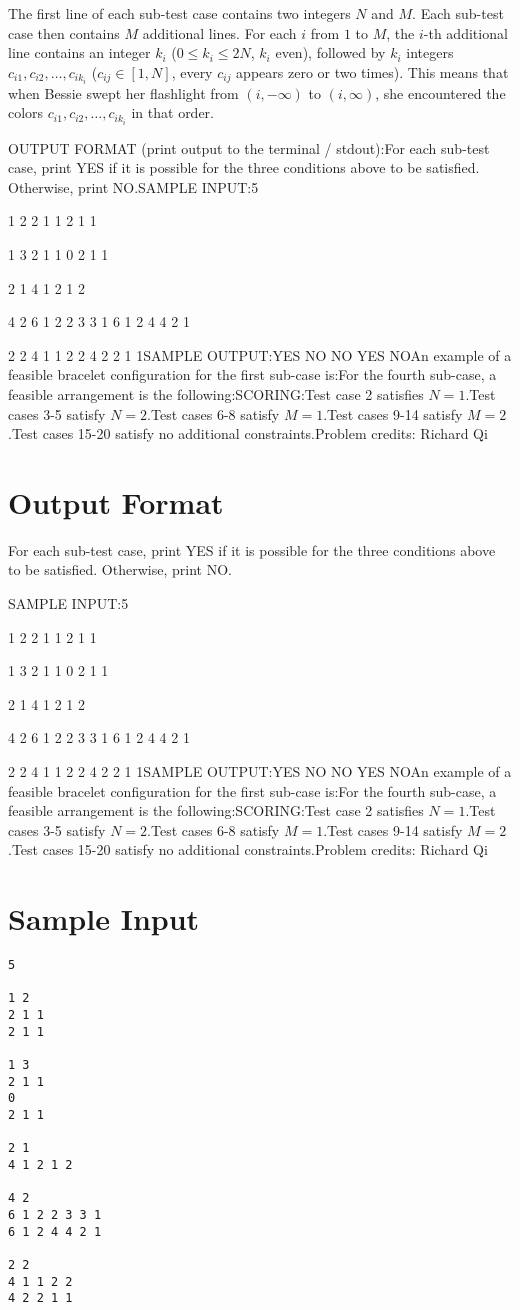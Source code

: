 \documentclass[12pt]{article}
\begin{document}
The first line of each sub-test case contains two integers $N$ and $M$. Each
sub-test case then contains $M$ additional lines. For each $i$ from $1$ to $M$,
the $i$-th additional line contains an integer $k_i$ ($0\le k_i\le 2N$, $k_i$
even), followed by $k_i$ integers $c_{i1}, c_{i2},\ldots, c_{ik_i}$
($c_{ij}\in [1,N]$, every $c_{ij}$ appears zero or two times). This means that
when Bessie swept her flashlight from $(i,-\infty)$ to $(i,\infty)$, she
encountered the colors $c_{i1}, c_{i2},\ldots, c_{ik_i}$ in that order.

OUTPUT FORMAT (print output to the terminal / stdout):For each sub-test case, print YES if it is possible for the three conditions
above to be satisfied. Otherwise, print NO.SAMPLE INPUT:5

1 2
2 1 1
2 1 1

1 3
2 1 1
0
2 1 1

2 1
4 1 2 1 2

4 2
6 1 2 2 3 3 1
6 1 2 4 4 2 1

2 2
4 1 1 2 2
4 2 2 1 1SAMPLE OUTPUT:YES
NO
NO
YES
NOAn example of a feasible bracelet configuration for the first sub-case is:For the fourth sub-case, a feasible arrangement is the following:SCORING:Test case 2 satisfies $N = 1$.Test cases 3-5 satisfy $N=2$.Test cases 6-8 satisfy $M=1$.Test cases 9-14 satisfy $M=2$.Test cases 15-20 satisfy no additional constraints.Problem credits: Richard Qi

\section*{Output Format}
For each sub-test case, print YES if it is possible for the three conditions
above to be satisfied. Otherwise, print NO.

SAMPLE INPUT:5

1 2
2 1 1
2 1 1

1 3
2 1 1
0
2 1 1

2 1
4 1 2 1 2

4 2
6 1 2 2 3 3 1
6 1 2 4 4 2 1

2 2
4 1 1 2 2
4 2 2 1 1SAMPLE OUTPUT:YES
NO
NO
YES
NOAn example of a feasible bracelet configuration for the first sub-case is:For the fourth sub-case, a feasible arrangement is the following:SCORING:Test case 2 satisfies $N = 1$.Test cases 3-5 satisfy $N=2$.Test cases 6-8 satisfy $M=1$.Test cases 9-14 satisfy $M=2$.Test cases 15-20 satisfy no additional constraints.Problem credits: Richard Qi

\section*{Sample Input}
\begin{verbatim}
5

1 2
2 1 1
2 1 1

1 3
2 1 1
0
2 1 1

2 1
4 1 2 1 2

4 2
6 1 2 2 3 3 1
6 1 2 4 4 2 1

2 2
4 1 1 2 2
4 2 2 1 1
\end{verbatim}
\end{document}
